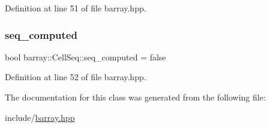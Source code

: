Definition at line 51 of file barray.\+hpp.

\mbox{\label{classbarray_1_1_cell_seq_a681fe627c2d8b932d8114e91cc8982e0}} 
\subsubsection{\texorpdfstring{seq\+\_\+computed}{seq\_computed}}
{\footnotesize\ttfamily bool barray\+::\+Cell\+Seq\+::seq\+\_\+computed = false\hspace{0.3cm}{\ttfamily [protected]}}



Definition at line 52 of file barray.\+hpp.



The documentation for this class was generated from the following file\+:\begin{DoxyCompactItemize}
\item 
include/\hyperlink{barray_8hpp}{barray.\+hpp}\end{DoxyCompactItemize}
